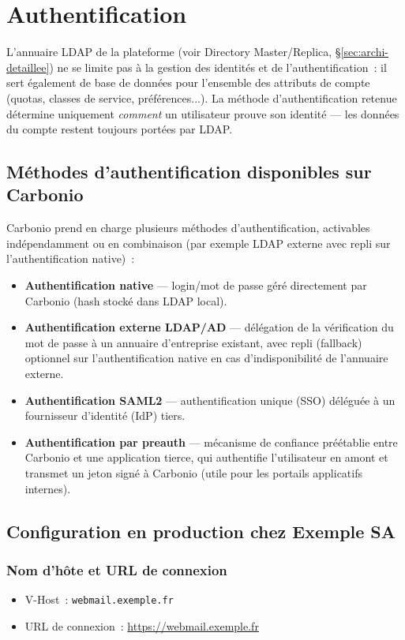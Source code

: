 \documentclass[11pt,a4paper]{report}
\begin{document}
\chapter{Authentification}
L'annuaire LDAP de la plateforme (voir Directory Master/Replica, \S\ref{sec:archi-detaillee}) ne se limite pas à la gestion des identités et de l'authentification~: il sert également de base de données pour l'ensemble des attributs de compte (quotas, classes de service, préférences...). La méthode d'authentification retenue détermine uniquement \emph{comment} un utilisateur prouve son identité --- les données du compte restent toujours portées par LDAP.

\section{Méthodes d'authentification disponibles sur Carbonio}
Carbonio prend en charge plusieurs méthodes d'authentification, activables indépendamment ou en combinaison (par exemple LDAP externe avec repli sur l'authentification native)~:
\begin{itemize}[nosep]
  \item \textbf{Authentification native} --- login/mot de passe géré directement par Carbonio (hash stocké dans LDAP local).
  \item \textbf{Authentification externe LDAP/AD} --- délégation de la vérification du mot de passe à un annuaire d'entreprise existant, avec repli (fallback) optionnel sur l'authentification native en cas d'indisponibilité de l'annuaire externe.
  \item \textbf{Authentification SAML2} --- authentification unique (SSO) déléguée à un fournisseur d'identité (IdP) tiers.
  \item \textbf{Authentification par preauth} --- mécanisme de confiance préétablie entre Carbonio et une application tierce, qui authentifie l'utilisateur en amont et transmet un jeton signé à Carbonio (utile pour les portails applicatifs internes).
\end{itemize}

\section{Configuration en production chez Exemple SA}

\subsection{Nom d'hôte et URL de connexion}
\begin{itemize}[nosep]
  \item V-Host~: \texttt{webmail.\allowbreak{}exemple.\allowbreak{}fr }
  \item URL de connexion~: \url{https://webmail.exemple.fr }
\end{itemize}
\end{document}
